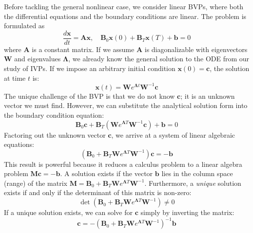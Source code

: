 Before tackling the general nonlinear case, we consider linear BVPs, where both the differential equations and the boundary conditions are linear. The problem is formulated as
\begin{equation}
    \frac{d\mathbf{x}}{dt} = \mathbf{A}\mathbf{x}, \quad \mathbf{B}_0 \mathbf{x}(0) + \mathbf{B}_T \mathbf{x}(T) + \mathbf{b} = 0
\end{equation}
where $\mathbf{A}$ is a constant matrix. If we assume $\mathbf{A}$ is diagonalizable with eigenvectors $\mathbf{W}$ and eigenvalues $\mathbf{\Lambda}$, we already know the general solution to the ODE from our study of IVPs. If we impose an arbitrary initial condition $\mathbf{x}(0) = \mathbf{c}$, the solution at time $t$ is:
\begin{equation}
    \mathbf{x}(t) = \mathbf{W} e^{\mathbf{\Lambda} t} \mathbf{W}^{-1} \mathbf{c}
\end{equation}
The unique challenge of the BVP is that we do not know $\mathbf{c}$; it is an unknown vector we must find. However, we can substitute the analytical solution form into the boundary condition equation:
\begin{equation}
    \mathbf{B}_0 \mathbf{c} + \mathbf{B}_T \left( \mathbf{W} e^{\mathbf{\Lambda} T} \mathbf{W}^{-1} \mathbf{c} \right) + \mathbf{b} = 0
\end{equation}
Factoring out the unknown vector $\mathbf{c}$, we arrive at a system of linear algebraic equations:
\begin{equation}
    \left( \mathbf{B}_0 + \mathbf{B}_T \mathbf{W} e^{\mathbf{\Lambda} T} \mathbf{W}^{-1} \right) \mathbf{c} = -\mathbf{b}
\end{equation}
This result is powerful because it reduces a calculus problem to a linear algebra problem $\mathbf{M}\mathbf{c} = -\mathbf{b}$. A solution exists if the vector $\mathbf{b}$ lies in the column space (range) of the matrix $\mathbf{M} = \mathbf{B}_0 + \mathbf{B}_T \mathbf{W} e^{\mathbf{\Lambda} T} \mathbf{W}^{-1}$. Furthermore, a \textit{unique} solution exists if and only if the determinant of this matrix is non-zero:
\begin{equation}
    \det \left( \mathbf{B}_0 + \mathbf{B}_T \mathbf{W} e^{\mathbf{\Lambda} T} \mathbf{W}^{-1} \right) \neq 0
\end{equation}
If a unique solution exists, we can solve for $\mathbf{c}$ simply by inverting the matrix:
\begin{equation}
    \mathbf{c} = - \left( \mathbf{B}_0 + \mathbf{B}_T \mathbf{W} e^{\mathbf{\Lambda} T} \mathbf{W}^{-1} \right)^{-1} \mathbf{b}
\end{equation}

